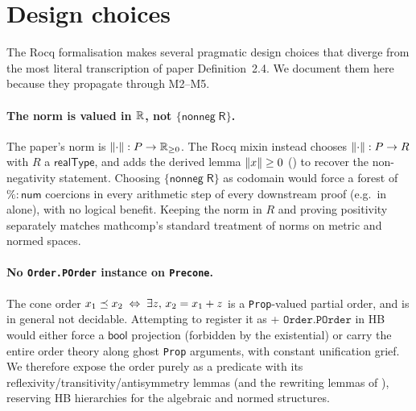 \section{Design choices}\label{sec:cones-design}

The Rocq formalisation makes several pragmatic design choices that
diverge from the most literal transcription of paper Definition~2.4.
We document them here because they propagate through M2--M5.

\paragraph{The norm is valued in \texorpdfstring{$\mathbb{R}$}{R}, not \texorpdfstring{$\mathsf{\{nonneg\;R\}}$}{nonneg R}.}
The paper's norm is $\lVert \cdot \rVert : P \to \mathbb{R}_{\geq 0}$. The Rocq mixin
 instead chooses
$\lVert \cdot \rVert : P \to R$ with $R$ a $\mathsf{realType}$, and adds
the derived lemma $\lVert x \rVert \geq 0$
() to recover the
non-negativity statement. Choosing $\mathsf{\{nonneg\;R\}}$ as codomain
would force a forest of $\%\!:\!\mathsf{num}$ coercions in every
arithmetic step of every downstream proof (e.g.\ in
 alone), with no logical
benefit. Keeping the norm in $R$ and proving positivity separately
matches mathcomp's standard treatment of norms on metric and
normed spaces.

\paragraph{No \texttt{Order.POrder} instance on \texttt{Precone}.}
The cone order
$x_1 \preceq x_2 \;\Leftrightarrow\; \exists z,\, x_2 = x_1 + z$
is a \texttt{Prop}-valued partial order, and is in general not
decidable. Attempting to register it as
 +
$\texttt{Order.POrder}$ in HB would either force a $\mathsf{bool}$
projection (forbidden by the existential) or carry the entire
order theory along ghost \texttt{Prop} arguments, with constant
unification grief. We therefore expose the order purely as a
predicate  with its
reflexivity/transitivity/antisymmetry lemmas (and the rewriting
lemmas of ), reserving
HB hierarchies for the algebraic and normed structures.

